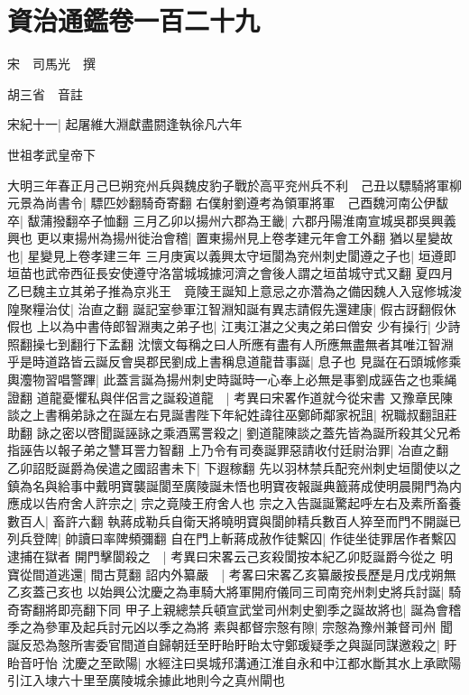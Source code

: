 \chapter{資治通鑑卷一百二十九}
宋　司馬光　撰

胡三省　音註

宋紀十一|{
	起屠維大淵獻盡閼逢執徐凡六年}


世祖孝武皇帝下

大明三年春正月己巳朔兖州兵與魏皮豹子戰於高平兖州兵不利　己丑以驃騎將軍柳元景為尚書令|{
	驃匹妙翻騎奇寄翻}
右僕射劉遵考為領軍將軍　己酉魏河南公伊馛卒|{
	馛蒲撥翻卒子恤翻}
三月乙卯以揚州六郡為王畿|{
	六郡丹陽淮南宣城吳郡吳興義興也}
更以東揚州為揚州徙治會稽|{
	置東揚州見上卷孝建元年會工外翻}
猶以星變故也|{
	星變見上卷孝建三年}
三月庚寅以義興太守垣閬為兖州刺史閬遵之子也|{
	垣遵即垣苗也武帝西征長安使遵守洛當城城據河濟之會後人謂之垣苗城守式又翻}
夏四月乙巳魏主立其弟子推為京兆王　竟陵王誕知上意忌之亦濳為之備因魏人入寇修城浚隍聚糧治仗|{
	治直之翻}
誕記室參軍江智淵知誕有異志請假先還建康|{
	假古訝翻假休假也}
上以為中書侍郎智淵夷之弟子也|{
	江夷江湛之父夷之弟曰僧安}
少有操行|{
	少詩照翻操七到翻行下孟翻}
沈懷文每稱之曰人所應有盡有人所應無盡無者其唯江智淵乎是時道路皆云誕反會吳郡民劉成上書稱息道龍昔事誕|{
	息子也}
見誕在石頭城修乘輿灋物習唱警蹕|{
	此蓋言誕為揚州刺史時誕時一心奉上必無是事劉成誣告之也乘䋲證翻}
道龍憂懼私與伴侶言之誕殺道龍　|{
	考異曰宋畧作道就今從宋書}
又豫章民陳談之上書稱弟詠之在誕左右見誕書陛下年紀姓諱往巫鄭師鄰家祝詛|{
	祝職叔翻詛莊助翻}
詠之密以啓聞誕誣詠之乘酒罵詈殺之|{
	劉道龍陳談之蓋先皆為誕所殺其父兄希指誣告以報子弟之讐耳詈力智翻}
上乃令有司奏誕罪惡請收付廷尉治罪|{
	冶直之翻}
乙卯詔貶誕爵為侯遣之國詔書未下|{
	下遐稼翻}
先以羽林禁兵配兖州刺史垣閬使以之鎮為名與給事中戴明寶襲誕閬至廣陵誕未悟也明寶夜報誕典籖蔣成使明晨開門為内應成以告府舍人許宗之|{
	宗之竟陵王府舍人也}
宗之入告誕誕驚起呼左右及素所畜養數百人|{
	畜許六翻}
執蔣成勒兵自衛天將曉明寶與閬帥精兵數百人猝至而門不開誕已列兵登陴|{
	帥讀曰率陴頻彌翻}
自在門上斬蔣成赦作徒繫囚|{
	作徒坐徒罪居作者繫囚逮捕在獄者}
開門擊閬殺之　|{
	考異曰宋畧云己亥殺閬按本紀乙卯貶誕爵今從之}
明寶從間道逃還|{
	間古莧翻}
詔内外纂嚴　|{
	考畧曰宋畧乙亥纂嚴按長歷是月戊戌朔無乙亥蓋己亥也}
以始興公沈慶之為車騎大將軍開府儀同三司南兖州刺史將兵討誕|{
	騎奇寄翻將即亮翻下同}
甲子上親總禁兵頓宣武堂司州刺史劉季之誕故將也|{
	誕為會稽季之為參軍及起兵討元凶以季之為將}
素與都督宗慤有隙|{
	宗慤為豫州兼督司州}
聞誕反恐為慤所害委官間道自歸朝廷至盱眙盱眙太守鄭瑗疑季之與誕同謀邀殺之|{
	盱眙音吁怡}
沈慶之至歐陽|{
	水經注曰吳城䢴溝通江淮自永和中江都水斷其水上承歐陽引江入埭六十里至廣陵城余據此地則今之真州閘也}
